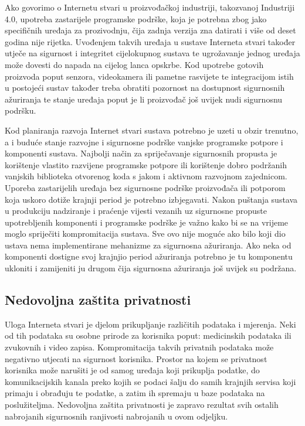 \documentclass[times, utf8, diplomski]{fer}
\begin{document}
Ako govorimo o Internetu stvari u proizvođačkoj industriji, takozvanoj Industriji 4.0, upotreba zastarijele programske podrške, koja je potrebna zbog jako specifičnih uređaja za prozivodnju, čija zadnja verzija zna datirati i više od deset godina nije rijetka. Uvođenjem takvih uređaja u sustave Interneta stvari također utječe na sigurnost i integritet cijelokupnog sustava te ugrožavanje jednog uređaja može dovesti do napada na cijelog lanca opskrbe. Kod upotrebe gotovih proizvoda poput senzora, videokamera ili pametne rasvijete te integracijom istih u postojeći sustav također treba obratiti pozornost na dostupnost sigurnosnih ažuriranja te stanje uređaja poput je li proizvođač još uvijek nudi sigurnosnu podršku.

Kod planiranja razvoja Internet stvari sustava potrebno je uzeti u obzir trenutno, a i buduće stanje razvojne i sigurnosne podrške vanjske programske potpore i komponenti sustava. Najbolji način za spriječavanje sigurnosnih propusta je korištenje vlastito razvijene programske potpore ili korištenje dobro podržanih vanjskih biblioteka otvorenog koda s jakom i aktivnom razvojnom zajednicom. Uporeba zastarijelih uređaja bez sigurnosne podrške proizvođača ili potporom koja uskoro dotiže krajnji period  je potrebno izbjegavati. Nakon puštanja sustava u produkciju nadziranje i praćenje vijesti vezanih uz sigurnosne propuste upotrebljenih komponenti i programske podrške je važno kako bi se na vrijeme moglo spriječiti kompromitacija sustava. Sve ovo nije moguće ako bilo koji dio ustava nema implementirane mehanizme za sigurnosna ažuriranja. Ako neka od komponenti dostigne svoj krajnjio period ažuriranja potrebno je tu komponentu ukloniti i zamijeniti ju drugom čija sigurnosna ažuriranja još uvijek su podržana.  

\subsection{Nedovoljna zaštita privatnosti}
Uloga Interneta stvari je djelom prikupljanje različitih podataka i mjerenja. Neki od tih podataka su osobne prirode za korisnika poput: medicinskih podataka ili zvukovnih i video zapisa. Kompromitacija takvih privatnih podataka može negativno utjecati na sigurnost korisnika. Prostor na kojem se privatnost korisnika može narušiti je od samog uređaja koji prikuplja podatke, do komunikacijskih kanala preko kojih se podaci šalju do samih krajnjih servisa koji primaju i obrađuju te podatke, a zatim ih spremaju u baze podataka na poslužiteljma. Nedovoljna zaštita privatnosti je zapravo rezultat svih ostalih nabrojanih sigurnosnih ranjivosti nabrojanih u ovom odjeljku. 
\end{document}
